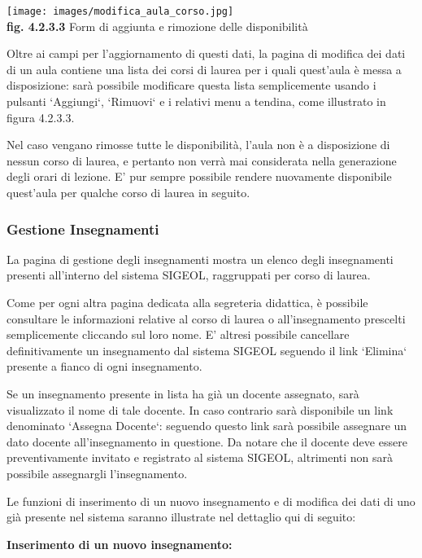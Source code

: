 \documentclass[11pt,a4paper]{article}
\begin{document}
\begin{center}
	\texttt{[image: images/modifica\_aula\_corso.jpg]}\\
	\textbf{fig. 4.2.3.3} Form di aggiunta e rimozione delle disponibilità\\
\end{center}

Oltre ai campi per l'aggiornamento di questi dati, la pagina di modifica dei dati di un aula contiene una lista dei corsi di laurea per i quali quest'aula è messa a disposizione: sarà possibile modificare questa lista semplicemente usando i pulsanti `Aggiungi`, `Rimuovi` e i relativi menu a tendina, come illustrato in figura 4.2.3.3.

Nel caso vengano rimosse tutte le disponibilità, l'aula non è a disposizione di nessun corso di laurea, e pertanto non verrà mai considerata nella generazione degli orari di lezione.
E' pur sempre possibile rendere nuovamente disponibile quest'aula per qualche corso di laurea in seguito.
\subsubsection{Gestione Insegnamenti}
La pagina di gestione degli insegnamenti mostra un elenco degli insegnamenti presenti all'interno del sistema SIGEOL, raggruppati per corso di laurea.

Come per ogni altra pagina dedicata alla segreteria didattica, è possibile consultare le informazioni relative al corso di laurea o all'insegnamento prescelti semplicemente cliccando sul loro nome.
E' altresi possibile cancellare definitivamente un insegnamento dal sistema SIGEOL seguendo il link `Elimina` presente a fianco di ogni insegnamento.

Se un insegnamento presente in lista ha già un docente assegnato, sarà visualizzato il nome di tale docente.
In caso contrario sarà disponibile un link denominato `Assegna Docente`: seguendo questo link sarà possibile assegnare un dato docente all'insegnamento in questione. Da notare che il docente deve essere preventivamente invitato e registrato al sistema SIGEOL, altrimenti non sarà possibile assegnargli l'insegnamento.

Le funzioni di inserimento di un nuovo insegnamento e di modifica dei dati di uno già presente nel sistema saranno illustrate nel dettaglio qui di seguito:
\newline \newline
\begin{large}\textbf{Inserimento di un nuovo insegnamento:}\end{large}
\end{document}
